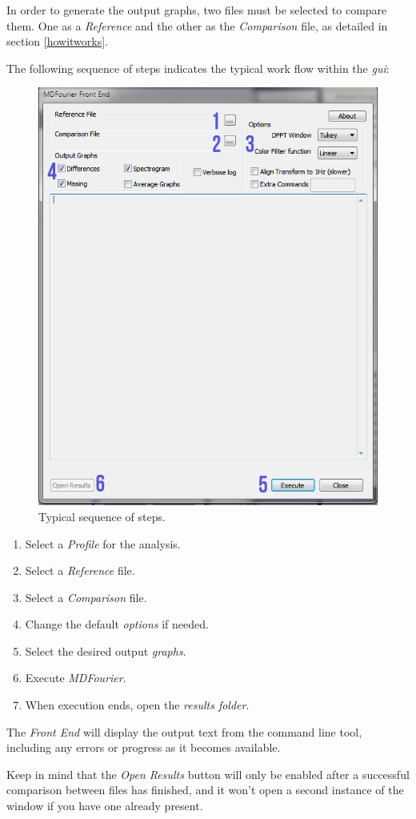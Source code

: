 \documentclass[10pt,a4paper]{report}
\newcommand{\ac}[1]{\textit{\acrshort{#1}}}
\begin{document}
\begin{appendices}
In order to generate the output graphs, two files must be selected to compare them. One as a \textit{Reference} and the other as the \textit{Comparison} file, as detailed in section \ref{howitworks}.

The following sequence of steps indicates the typical work flow within the \ac{gui}:

\begin{figure}[H]
	\centering
	\includegraphics[width=0.6\linewidth]{images/GUI/GUI2.png}
	\caption[Steps]{Typical sequence of steps.}
	\label{fig:gui2}
\end{figure}

\begin{enumerate}
	\item Select a \textit{Profile} for the analysis.
	\item Select a \textit{Reference} file.
	\item Select a \textit{Comparison} file.
	\item Change the default \textit{options} if needed.
	\item Select the desired output \textit{graphs}.
	\item Execute \textit{MDFourier}.
	\item When execution ends, open the \textit{results folder}.
\end{enumerate}

The \textit{Front End} will display the output text from the command line tool, including any errors or progress as it becomes available.

Keep in mind that the \textit{Open Results} button will only be enabled after a successful comparison between files has finished, and it won't open a second instance of the window if you have one already present.


\end{appendices}
\end{document}
